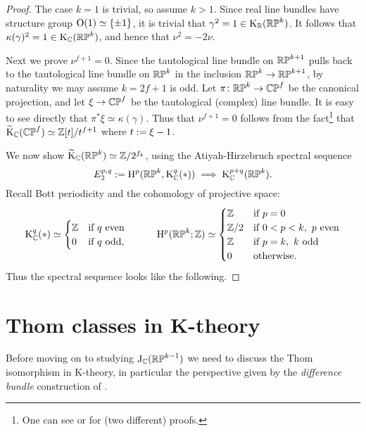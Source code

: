 \begin{proof}
  The case $k=1$ is trivial, so assume $k > 1$. Since real line
  bundles have structure group $\mathrm{O}(1) \simeq \{\pm 1\}$, it is trivial
  that $\gamma^2 = 1 \in \mathrm{K}_{\mathbb{R}}(\mathbb{RP}^k)$. It follows that
  $\kappa(\gamma)^2 = 1 \in \mathrm{K}_{\mathbb{C}}(\mathbb{RP}^k)$, and hence that $\nu^2 =
  -2\nu$.

  Next we prove $\nu^{f+1} = 0$. Since the tautological line bundle on
  $\mathbb{RP}^{k+1}$ pulls back to the tautological line bundle on $\mathbb{RP}^k$ in
  the inclusion $\mathbb{RP}^k \to \mathbb{RP}^{k+1}$, by naturality we may assume $k
  = 2f+1$ is odd. Let $\pi \colon \mathbb{RP}^k \to \mathbb{CP}^f$ be the canonical
  projection, and let $\xi \to \mathbb{CP}^f$ be the tautological (complex)
  line bundle. It is easy to see directly that $\pi^*\xi \simeq
  \kappa(\gamma)$. Thus that $\nu^{f+1} = 0$ follows from the
  fact\footnote{One can see \cite{atiyah-kthy} or \cite{adams-vfields}
    for (two different) proofs.}  that $\widetilde{\mathrm{K}}_{\mathbb{C}}(\mathbb{CP}^f) \simeq
  \mathbb{Z}[t]/t^{f+1}$ where $t \mathrel{:=} \xi - 1$.

  We now show $\widetilde{\mathrm{K}}_{\mathbb{C}}(\mathbb{RP}^k) \simeq \mathbb{Z}/2^{f_k}$, using the
  Atiyah-Hirzebruch spectral sequence
  \[
  E_2^{p,q} \mathrel{:=} \mathrm{H}^p(\mathbb{RP}^k,\mathrm{K}_{\mathbb{C}}^q(*)) \implies \mathrm{K}_{\mathbb{C}}^{p+q}(\mathbb{RP}^k).
  \]
  Recall Bott periodicity and the cohomology of projective space:
  \[
  \mathrm{K}_{\mathbb{C}}^q(*) \simeq
  \begin{cases}
    \mathbb{Z} & \text{if }q\text{ even} \\
    0 & \text{if }q\text{ odd},
  \end{cases}
  \hspace{30pt}
  \mathrm{H}^p(\mathbb{RP}^k;\mathbb{Z}) \simeq
  \begin{cases}
    \mathbb{Z} & \text{if }p=0 \\
    \mathbb{Z}/2 & \text{if }0 < p < k,\ p\text{ even} \\
    \mathbb{Z} & \text{if }p=k,\ k\text{ odd} \\
    0 & \text{otherwise}.
  \end{cases}
  \]  
  Thus the spectral sequence looks like the following.
\end{proof}


\section{Thom classes in K-theory}

Before moving on to studying $\mathrm{J}_{\mathbb{C}}(\mathbb{RP}^{k-1})$ we need to discuss the
Thom isomorphism in K-theory, in particular the perspective given by
the \emph{difference bundle} construction of \cite{abs-clifford}.

